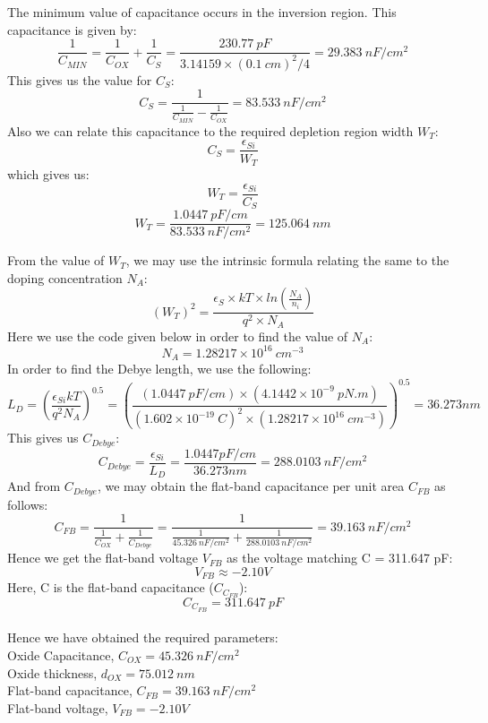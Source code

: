 \documentclass[12pt]{article}
\begin{document}
The minimum value of capacitance occurs in the inversion region. This capacitance is given by:
\[\frac{1}{C_{MIN}} = \frac{1}{C_{OX}} + \frac{1}{C_{S}} = \frac{230.77\ pF}{3.14159 \times (0.1\ cm)^2 / 4} = 29.383\ nF/cm^2\]
This gives us the value for \(C_{S}\):
\[C_{S} = \frac{1}{\frac{1}{C_{MIN}} - \frac{1}{C_{OX}}} = 83.533\ nF/cm^2\]
Also we can relate this capacitance to the required depletion region width \(W_T\):
\[C_{S} = \frac{\epsilon_{Si}}{W_T}\]
which gives us:
\[W_T = \frac{\epsilon_{Si}}{C_S}\]
\[W_T = \frac{1.0447\ pF/cm}{83.533\ nF/cm^2} = 125.064\ nm\]

From the value of \(W_T\), we may use the intrinsic formula relating the same to the doping concentration \(N_A\):
\[(W_T)^2 = \frac{\epsilon_S \times kT \times ln\left(\frac{N_A}{n_i}\right)}{q^2 \times N_A}\]
Here we use the code given below in order to find the value of \(N_A\):
\[N_A = 1.28217\times 10^{16}\ cm^{-3}\]
In order to find the Debye length, we use the following:
\[L_D = \left(\frac{\epsilon_{Si}kT}{q^2N_A}\right)^{0.5} = \left(\frac{(1.0447\ pF/cm) \times (4.1442\times10^{-9}\ pN.m)}{(1.602\times10^{-19}\ C)^2\times (1.28217\times 10^{16}\ cm^{-3})}\right)^{0.5} = 36.273 nm\]
This gives us \(C_{Debye}\):
\[C_{Debye} = \frac{\epsilon_{Si}}{L_D} = \frac{1.0447 pF/cm}{36.273 nm} = 288.0103\ nF/cm^{2}\]
And from \(C_{Debye}\), we may obtain the flat-band capacitance per unit area \(C_{FB}\) as follows:
\[C_{FB} = \frac{1}{\frac{1}{C_{OX}} + \frac{1}{C_{Debye}}} = \frac{1}{\frac{1}{45.326\ nF/cm^2} + \frac{1}{288.0103\ nF/cm^2}} = 39.163\ nF/cm^2\]
Hence we get the flat-band voltage \(V_{FB}\) as the voltage matching C = 311.647 pF:
\[V_{FB} \approx -2.10 V\]
Here, C is the flat-band capacitance (\(C_{C_{FB}}\)):
\[C_{C_{FB}} = 311.647\ pF\]\\

Hence we have obtained the required parameters:\\
Oxide Capacitance, \(C_{OX} = 45.326\ nF/cm^2 \)\\
Oxide thickness, \(d_{OX} = 75.012\ nm\)\\
Flat-band capacitance, \(C_{FB} = 39.163\ nF/cm^2\)\\
Flat-band voltage, \(V_{FB} = -2.10 V\)
\end{document}
